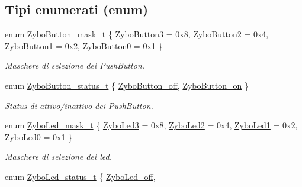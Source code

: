\subsection*{Tipi enumerati (enum)}
\begin{DoxyCompactItemize}
\item 
enum \hyperlink{group___zybo_ga4d26a5f6cad606de534ba034e0ba42dd}{Zybo\+Button\+\_\+mask\+\_\+t} \{ \hyperlink{group___zybo_gga4d26a5f6cad606de534ba034e0ba42ddaabede392be8cae14b8a070a804c754e8}{Zybo\+Button3} = 0x8, 
\hyperlink{group___zybo_gga4d26a5f6cad606de534ba034e0ba42dda2aa888c8f01ac8a79013e5ebc9eef609}{Zybo\+Button2} = 0x4, 
\hyperlink{group___zybo_gga4d26a5f6cad606de534ba034e0ba42dda29c35ef3133898c050f675a60de66dd7}{Zybo\+Button1} = 0x2, 
\hyperlink{group___zybo_gga4d26a5f6cad606de534ba034e0ba42dda2f821ce9661687aefb0ec4de65911570}{Zybo\+Button0} = 0x1
 \}
\begin{DoxyCompactList}\small\item\em Maschere di selezione dei Push\+Button. \end{DoxyCompactList}\item 
enum \hyperlink{group___zybo_ga85c290bfa232cab213e69200bf78e06a}{Zybo\+Button\+\_\+status\+\_\+t} \{ \hyperlink{group___zybo_gga85c290bfa232cab213e69200bf78e06aacd110f28912806bcec929721e8737399}{Zybo\+Button\+\_\+off}, 
\hyperlink{group___zybo_gga85c290bfa232cab213e69200bf78e06aa49bf4a6902270f28bc6a1146fbd1b1fe}{Zybo\+Button\+\_\+on}
 \}
\begin{DoxyCompactList}\small\item\em Status di attivo/inattivo dei Push\+Button. \end{DoxyCompactList}\item 
enum \hyperlink{group___zybo_gad11701cccac394f7e1f90de8f85695f3}{Zybo\+Led\+\_\+mask\+\_\+t} \{ \hyperlink{group___zybo_ggad11701cccac394f7e1f90de8f85695f3adc5edc2adfd899da9f149cb61364b141}{Zybo\+Led3} = 0x8, 
\hyperlink{group___zybo_ggad11701cccac394f7e1f90de8f85695f3a4fa521f6fce7c4ba77d1d8144e71cdfc}{Zybo\+Led2} = 0x4, 
\hyperlink{group___zybo_ggad11701cccac394f7e1f90de8f85695f3ad71c06f65dfffcf825d48f287718d9be}{Zybo\+Led1} = 0x2, 
\hyperlink{group___zybo_ggad11701cccac394f7e1f90de8f85695f3ae1a1e8fa0bf803793ff27004884b85fe}{Zybo\+Led0} = 0x1
 \}
\begin{DoxyCompactList}\small\item\em Maschere di selezione dei led. \end{DoxyCompactList}\item 
enum \hyperlink{group___zybo_ga3dcb274f22e577705c49944b8d1f4b12}{Zybo\+Led\+\_\+status\+\_\+t} \{ \hyperlink{group___zybo_gga3dcb274f22e577705c49944b8d1f4b12a9679f1c302afdb51915a2331b4ec92f3}{Zybo\+Led\+\_\+off}, 

\end{DoxyCompactItemize}
